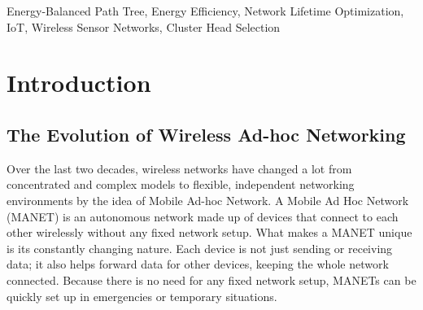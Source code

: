 \documentclass[conference]{IEEEtran}
\begin{document}
\begin{abstract}
In modern Internet of Things (IoT) systems Wireless Sensor Networks (WSNs) holds an irreplaceable position, but their lifetime is often limited by the problem of Energy Hole. Here nodes near the Base Station drain their energy quickly because they handle most of the data forwarding, which can cause the network to break apart. Old routing protocols  such as LEACH, HEED, and PEGASIS try to reduce this issue using random rotation or chain-based structures. However, that methods achieve only about 10–15\% of the network’s theoretical maximum lifetime. Vanguard-WSN, a new framework that replaces random decision-making with a utility-based deterministic approach. The framework includes two key innovations: (1) a Composite Utility Index (Ui) that selects Cluster Heads based on remaining energy and network position, and (2) an Energy-Balanced Path Tree (EBPT) that uses an adaptive load-balancing factor ($\gamma$) to adjust multi-hop routes and prevent energy hotspots. After testing the system through over 30 simulations on a 100-node network, it was found that Vanguard-WSN is better than older systems. The First Node Death (FND) occurs at Round 993.1, which is over ten times longer than LEACH (FND = 97.3). When compared with a Theoretical God-Line (LP-Bound), Vanguard achieves 92\% of the optimal lifetime (R2=0.94). The system achieves a Packet Success Ratio of 98.4\% and delivers 955\% more data packets than LEACH. A formal analysis shows that the algorithm runs in O(NlogN) time, meaning it remains efficient even as the network size increases, making it practical for low-power microcontrollers. These results show that Vanguard-WSN provides a highly efficient and practical solution for mission-critical WSN applications.
\end{abstract}

\begin{IEEEkeywords}
Energy-Balanced Path Tree, Energy Efficiency, Network Lifetime Optimization, IoT, Wireless Sensor Networks, Cluster Head Selection
\end{IEEEkeywords}

\section{Introduction}

\subsection{The Evolution of Wireless Ad-hoc Networking}
Over the last two decades, wireless networks have changed a lot from concentrated and complex models to flexible, independent networking environments by the idea of Mobile Ad-hoc Network. A Mobile Ad Hoc Network (MANET) is an autonomous network made up of devices that connect to each other wirelessly without any fixed network setup. What makes a MANET unique is its constantly changing nature. Each device is not just sending or receiving data; it also helps forward data for other devices, keeping the whole network connected. Because there is no need for any fixed network setup, MANETs can be quickly set up in emergencies or temporary situations.
\end{document}
